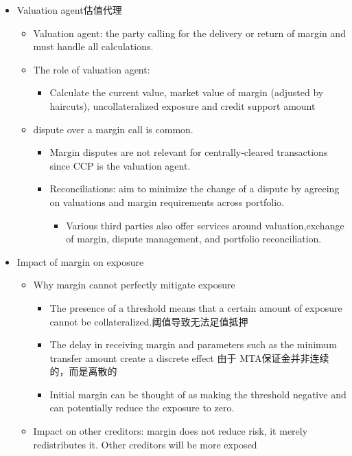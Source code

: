 \begin{itemize}
    \item Valuation agent估值代理
    \begin{itemize}
    \item Valuation agent: the party calling for the delivery or return of margin and must handle all calculations.
    \item The role of valuation agent:
    \begin{itemize}
    \item Calculate the current value, market value of margin (adjusted by haircuts), uncollateralized exposure and credit support amount
    \end{itemize}
\item dispute over a margin call is common.
\begin{itemize}
\item Margin disputes are not relevant for centrally-cleared
transactions since CCP is the valuation agent.
\item Reconciliations: aim to minimize the change of a dispute
by agreeing on valuations and margin requirements across
portfolio.

\begin{itemize}
    \item Various third parties also offer services around valuation,exchange of margin, dispute management, and portfolio reconciliation.
\end{itemize}


\end{itemize}

\end{itemize}

\item Impact of margin on exposure
\begin{itemize}
\item Why margin cannot perfectly mitigate exposure
\begin{itemize}
\item The presence of a threshold means that a certain amount of exposure cannot be collateralized.阈值导致无法足值抵押
\item The delay in receiving margin and parameters such as the minimum transfer amount create a discrete effect 由于 MTA保证金并非连续的，而是离散的
\item Initial margin can be thought of as making the threshold negative and can potentially reduce the exposure to zero.
\end{itemize}
\item Impact on other creditors: margin does not reduce risk, it merely redistributes it. Other creditors will be more exposed





\end{itemize}
\end{itemize}
